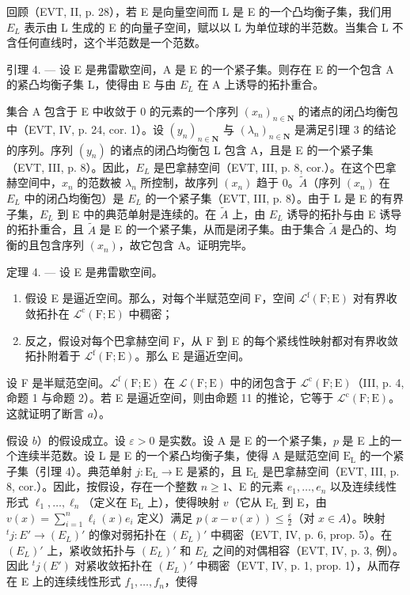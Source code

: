 回顾（EVT, II, p. 28），若 E 是向量空间而 L 是 E 的一个凸均衡子集，我们用 \(E_{L}\) 表示由 L 生成的 E 的向量子空间，赋以以 L 为单位球的半范数。当集合 L 不含任何直线时，这个半范数是一个范数。

引理 4. — 设 E 是弗雷歇空间，A 是 E 的一个紧子集。则存在 E 的一个包含 A 的紧凸均衡子集 L，使得由 E 与由 \(E_{L}\) 在 A 上诱导的拓扑重合。

集合 A 包含于 E 中收敛于 0 的元素的一个序列 \((x_{n})_{n\in\mathbf{N}}\) 的诸点的闭凸均衡包中（EVT, IV, p. 24, cor. 1）。设 \((y_{n})_{n\in\mathbf{N}}\) 与 \((\lambda_{n})_{n\in\mathbf{N}}\) 是满足引理 3 的结论的序列。序列 \((y_{n})\) 的诸点的闭凸均衡包 L 包含 A，且是 E 的一个紧子集（EVT, III, p. 8）。因此，\(E_{L}\) 是巴拿赫空间（EVT, III, p. 8, cor.）。在这个巴拿赫空间中，\(x_{n}\) 的范数被 \(\lambda_{n}\) 所控制，故序列 \((x_{n})\) 趋于 0。\(\widetilde{A}\)（序列 \((x_{n})\) 在 \(E_{L}\) 中的闭凸均衡包）是 \(E_{L}\) 的一个紧子集（EVT, III, p. 8）。由于 L 是 E 的有界子集，\(E_{L}\) 到 E 中的典范单射是连续的。在 \(\widetilde{A}\) 上，由 \(E_{L}\) 诱导的拓扑与由 E 诱导的拓扑重合，且 \(\widetilde{A}\) 是 E 的一个紧子集，从而是闭子集。由于集合 \(\widetilde{A}\) 是凸的、均衡的且包含序列 \((x_{n})\)，故它包含 A。证明完毕。

定理 4. --- 设 E 是弗雷歇空间。

\begin{enumerate}
\def\labelenumi{\alph{enumi})}
\item
  假设 E 是逼近空间。那么，对每个半赋范空间 F，空间 \(\mathcal{L}^{\mathrm{f}}(\mathrm{F};\mathrm{E})\) 对有界收敛拓扑在 \(\mathcal{L}^{\mathrm{c}}(\mathrm{F};\mathrm{E})\) 中稠密；
\item
  反之，假设对每个巴拿赫空间 F，从 F 到 E 的每个紧线性映射都对有界收敛拓扑附着于 \(\mathcal{L}^{\mathrm{f}}(\mathrm{F};\mathrm{E})\)。那么 E 是逼近空间。
\end{enumerate}

设 F 是半赋范空间。\(\mathcal{L}^{\mathrm{f}}(\mathrm{F};\mathrm{E})\) 在 \(\mathcal{L}(\mathrm{F};\mathrm{E})\) 中的闭包含于 \(\mathcal{L}^{\mathrm{c}}(\mathrm{F};\mathrm{E})\)（III, p. 4, 命题 1 与命题 2）。若 E 是逼近空间，则由命题 11 的推论，它等于 \(\mathcal{L}^{\mathrm{c}}(\mathrm{F};\mathrm{E})\)。这就证明了断言 \(a\)）。

假设 \(b\)）的假设成立。设 \(\varepsilon > 0\) 是实数。设 A 是 E 的一个紧子集，\(p\) 是 E 上的一个连续半范数。设 L 是 E 的一个紧凸均衡子集，使得 A 是赋范空间 \(\mathrm{E_L}\) 的一个紧子集（引理 4）。典范单射 \(j: \mathrm{E_L} \to \mathrm{E}\) 是紧的，且 \(\mathrm{E_L}\) 是巴拿赫空间（EVT, III, p. 8, cor.）。因此，按假设，存在一个整数 \(n \geqslant 1\)、E 的元素 \(e_1, \ldots, e_n\) 以及连续线性形式 \(\ell_1, \ldots, \ell_n\)（定义在 \(\mathrm{E_L}\) 上），使得映射 \(v\)（它从 \(\mathrm{E_L}\) 到 E，由 \(v(x) = \sum_{i=1}^{n} \ell_i(x)e_i\) 定义）满足 \(p(x - v(x)) \leqslant \frac{\varepsilon}{2}\)（对 \(x \in A\)）。映射 \({}^{t}j: E' \to (E_{L})'\) 的像对弱拓扑在 \((E_{L})'\) 中稠密（EVT, IV, p. 6, prop. 5）。在 \((E_{L})'\) 上，紧收敛拓扑与 \((E_{L})'\) 和 \(E_{L}\) 之间的对偶相容（EVT, IV, p. 3, 例）。因此 \({}^{t}j(E')\) 对紧收敛拓扑在 \((E_{L})'\) 中稠密（EVT, IV, p. 1, prop. 1），从而存在 E 上的连续线性形式 \(f_{1}, \ldots, f_{n}\)，使得


